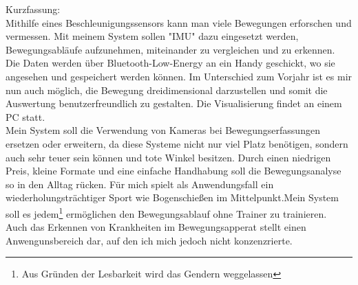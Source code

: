 Kurzfassung:\\
\small
Mithilfe eines Beschleunigungssensors kann man viele Bewegungen erforschen und vermessen. 
Mit meinem System sollen "IMU" dazu eingesetzt werden, Bewegungsabläufe aufzunehmen, miteinander zu vergleichen 
und zu erkennen. \\
Die Daten werden über Bluetooth-Low-Energy an ein Handy geschickt, wo sie angesehen und gespeichert 
werden können. Im Unterschied zum Vorjahr ist es mir nun auch möglich, die Bewegung dreidimensional 
darzustellen und somit die Auswertung benutzerfreundlich zu gestalten. Die Visualisierung findet an 
einem PC statt.\\
Mein System soll die Verwendung von Kameras bei Bewegungserfassungen ersetzen oder erweitern, da diese Systeme 
nicht nur viel Platz benötigen, sondern auch sehr teuer sein können und tote Winkel besitzen. 
Durch einen niedrigen Preis, kleine Formate und eine einfache Handhabung soll die Bewegungsanalyse 
so in den Alltag rücken. Für mich spielt als Anwendungsfall ein wiederholungsträchtiger Sport wie 
Bogenschießen im Mittelpunkt.Mein System soll es jedem\footnote{Aus Gründen der Lesbarkeit wird das Gendern weggelassen} 
ermöglichen den Bewegungsablauf ohne Trainer zu trainieren.\\
Auch das Erkennen von Krankheiten im Bewegungsapperat  stellt einen Anwengunsbereich dar, auf den ich mich jedoch nicht konzenzrierte.